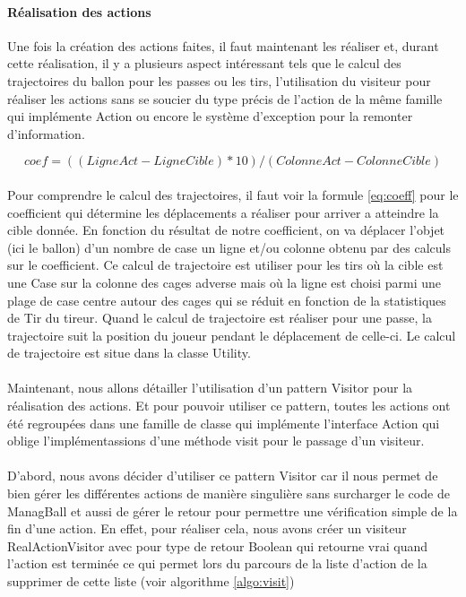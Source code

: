 \paragraph{Réalisation des actions}
    Une fois la création des actions faites, il faut maintenant les réaliser et, durant cette réalisation, il y a plusieurs aspect intéressant tels que le calcul des trajectoires du ballon pour les passes ou les tirs, l'utilisation du visiteur pour réaliser les actions sans se soucier du type précis de l'action de la même famille qui implémente Action ou encore le système d'exception pour la remonter d'information.

\begin{equation}
coef = ((LigneAct - LigneCible)*10)/(ColonneAct - ColonneCible)
\label{eq:coeff}
\end{equation}

\paragraph{}
    Pour comprendre le calcul des trajectoires, il faut voir la formule \ref{eq:coeff} pour le coefficient qui détermine les déplacements a réaliser pour arriver a atteindre la cible donnée. En fonction du résultat de notre coefficient, on va déplacer l'objet (ici le ballon) d'un nombre de case un ligne et/ou colonne obtenu par des calculs sur le coefficient. Ce calcul de trajectoire est utiliser pour les tirs où la cible est une Case sur la colonne des cages adverse mais où la ligne est choisi parmi une plage de case centre autour des cages qui se réduit en fonction de la statistiques de Tir du tireur. Quand le calcul de trajectoire est réaliser pour une passe, la trajectoire suit la position du joueur pendant le déplacement de celle-ci. Le calcul de trajectoire est situe dans la classe Utility.

\paragraph{}
    Maintenant, nous allons détailler l'utilisation d'un pattern Visitor pour la réalisation des actions. Et pour pouvoir utiliser ce pattern, toutes les actions ont été regroupées dans une famille de classe qui implémente l'interface Action qui oblige l'implémentassions d'une méthode visit pour le passage d'un visiteur.

\paragraph{}
    D'abord, nous avons décider d'utiliser ce pattern Visitor car il nous permet de bien gérer les différentes actions de manière singulière sans surcharger le code de ManagBall et aussi de gérer le retour pour permettre une vérification simple de la fin d'une action. En effet, pour réaliser cela, nous avons créer un visiteur RealActionVisitor avec pour type de retour Boolean qui retourne vrai quand l'action est terminée ce qui permet lors du parcours de la liste d'action de la supprimer de cette liste (voir algorithme \ref{algo:visit})

